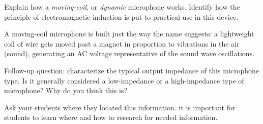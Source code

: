 

Explain how a {\it moving-coil}, or {\it dynamic} microphone works.  Identify how the principle of electromagnetic induction is put to practical use in this device.







A moving-coil microphone is built just the way the name suggests: a lightweight coil of wire gets moved past a magnet in proportion to vibrations in the air (sound), generating an AC voltage representative of the sound wave oscillations.

\vskip 10pt

Follow-up question: characterize the typical output impedance of this microphone type.  Is it generally considered a low-impedance or a high-impedance type of microphone?  Why do you think this is?







Ask your students where they located this information.  it is important for students to learn where and how to research for needed information.




